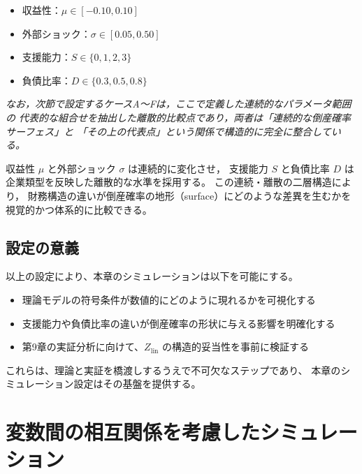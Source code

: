 \begin{itemize}
    \item 収益性：$\mu \in [-0.10, 0.10]$
    \item 外部ショック：$\sigma \in [0.05, 0.50]$
    \item 支援能力：$S \in \{0,1,2,3\}$
    \item 負債比率：$D \in \{0.3, 0.5, 0.8\}$
\end{itemize}

\textit{なお，次節で設定するケースA〜Fは，ここで定義した連続的なパラメータ範囲の
代表的な組合せを抽出した離散的比較点であり，両者は「連続的な倒産確率サーフェス」と
「その上の代表点」という関係で構造的に完全に整合している。}

収益性 $\mu$ と外部ショック $\sigma$ は連続的に変化させ，
支援能力 $S$ と負債比率 $D$ は企業類型を反映した離散的な水準を採用する。
この連続・離散の二層構造により，
財務構造の違いが倒産確率の地形（surface）にどのような差異を生むかを
視覚的かつ体系的に比較できる。


\subsection*{設定の意義}

以上の設定により、本章のシミュレーションは以下を可能にする。

\begin{itemize}
    \item 理論モデルの符号条件が数値的にどのように現れるかを可視化する
    \item 支援能力や負債比率の違いが倒産確率の形状に与える影響を明確化する
    \item 第9章の実証分析に向けて、$Z_{\text{lin}}$ の構造的妥当性を事前に検証する
\end{itemize}

これらは、理論と実証を橋渡しするうえで不可欠なステップであり、
本章のシミュレーション設定はその基盤を提供する。


\section{変数間の相互関係を考慮したシミュレーション}

